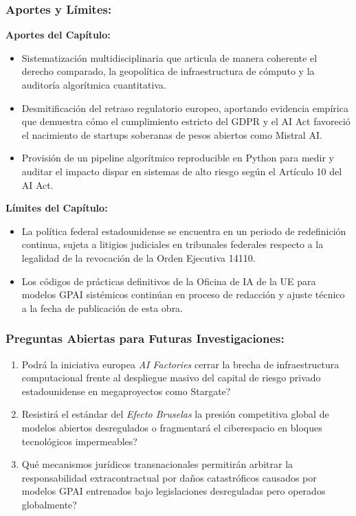 \subsubsection*{Aportes y Límites:}
\textbf{Aportes del Capítulo:}
\begin{itemize}[leftmargin=2em]
    \item Sistematización multidisciplinaria que articula de manera coherente el derecho comparado, la geopolítica de infraestructura de cómputo y la auditoría algorítmica cuantitativa.
    \item Desmitificación del retraso regulatorio europeo, aportando evidencia empírica que demuestra cómo el cumplimiento estricto del GDPR y el AI Act favoreció el nacimiento de startups soberanas de pesos abiertos como Mistral AI.
    \item Provisión de un pipeline algorítmico reproducible en Python para medir y auditar el impacto dispar en sistemas de alto riesgo según el Artículo 10 del AI Act.
\end{itemize}
\textbf{Límites del Capítulo:}
\begin{itemize}[leftmargin=2em]
    \item La política federal estadounidense se encuentra en un periodo de redefinición continua, sujeta a litigios judiciales en tribunales federales respecto a la legalidad de la revocación de la Orden Ejecutiva 14110.
    \item Los códigos de prácticas definitivos de la Oficina de IA de la UE para modelos GPAI sistémicos continúan en proceso de redacción y ajuste técnico a la fecha de publicación de esta obra.
\end{itemize}

\subsubsection*{Preguntas Abiertas para Futuras Investigaciones:}
\begin{enumerate}[leftmargin=2em]
    \item \textquestiondown Podrá la iniciativa europea \textit{AI Factories} cerrar la brecha de infraestructura computacional frente al despliegue masivo del capital de riesgo privado estadounidense en megaproyectos como Stargate?
    \item \textquestiondown Resistirá el estándar del \textit{Efecto Bruselas} la presión competitiva global de modelos abiertos desregulados o fragmentará el ciberespacio en bloques tecnológicos impermeables?
    \item \textquestiondown Qué mecanismos jurídicos transnacionales permitirán arbitrar la responsabilidad extracontractual por daños catastróficos causados por modelos GPAI entrenados bajo legislaciones desreguladas pero operados globalmente?
\end{enumerate}

